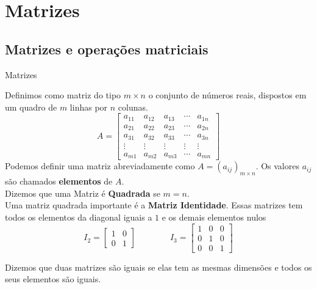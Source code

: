 \chapter{Matrizes}
\label{cap:matrizes}

\section{Matrizes e operações matriciais }

\begin{teoria}{Matrizes}
    
    Definimos como matriz do tipo $m\times n$ o conjunto de números reais, dispostos em um quadro de $m$ linhas por $n$ colunas.
    \[ A = \left[
    \begin{array}{ccccc}
        a_{11} & a_{12} & a_{13} & \cdots & a_{1n} \\
        a_{21} & a_{22} & a_{23} & \cdots & a_{2n} \\
        a_{31} & a_{32} & a_{33} & \cdots & a_{3n} \\
        \vdots & \vdots & \vdots & \vdots & \vdots \\
        a_{m1} & a_{m2} & a_{m3} & \cdots & a_{mn} 
    \end{array}
    \right] \]
    Podemos definir uma matriz abreviadamente como $A=(a_{ij})_{m\times n}$.
    Os valores $a_{ij}$ são chamados \textbf{elementos} de $A$.
    \\
    
    Dizemos que uma Matriz é \textbf{Quadrada} se $m=n$. 
    \\
    
    Uma matriz quadrada importante é a \textbf{Matriz Identidade}. Essas matrizes tem todos os elementos da diagonal iguais a $1$ e os demais elementos nulos
    \[ 
        I_2 = \left[\begin{array}{cc}
            1 & 0 \\ 
            0 & 1
        \end{array}\right] 
    \qquad\qquad
         I_3 = \left[\begin{array}{ccc}
             1 & 0 & 0 \\ 
             0 & 1 & 0 \\
             0 & 0 & 1 
         \end{array}\right] 
     \]
     
     Dizemos que duas matrizes são iguais se elas tem as mesmas dimensões e todos os seus elementos são iguais.
     
\end{teoria}

